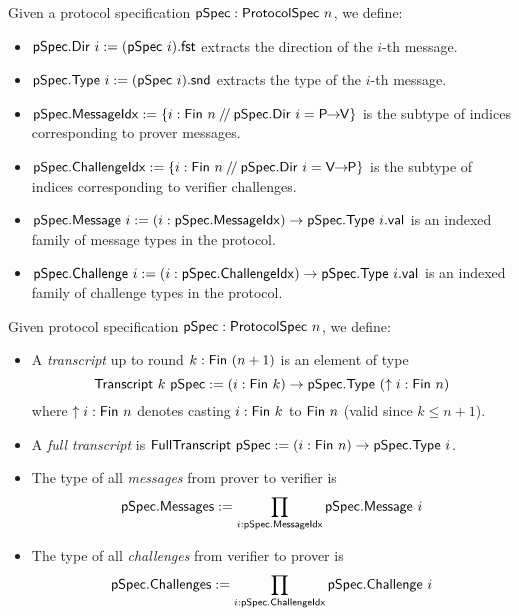 \begin{definition}
    \label{def:protocol_spec_components}
    Given a protocol specification $\pSpec : \ProtocolSpec\ n$, we define:
    \begin{itemize}
        \item $\pSpec.\Dir\ i := (\pSpec\ i).\mathsf{fst}$ extracts the direction of the $i$-th message.
        \item $\pSpec.\Type\ i := (\pSpec\ i).\mathsf{snd}$ extracts the type of the $i$-th message.
        \item $\mathsf{pSpec}.\mathsf{MessageIdx} := \{i : \mathsf{Fin}\ n \mathbin{/\!/} \mathsf{pSpec}.\mathsf{Dir}\ i = \mathsf{P \!\!\rightarrow\!\! V}\}$ is the subtype of indices corresponding to prover messages.
        \item $\mathsf{pSpec}.\mathsf{ChallengeIdx} := \{i : \mathsf{Fin}\ n \mathbin{/\!/} \mathsf{pSpec}.\mathsf{Dir}\ i = \mathsf{V \!\!\rightarrow\!\! P}\}$ is the subtype of indices corresponding to verifier challenges.
        \item $\mathsf{pSpec}.\mathsf{Message}\ i := (i : \mathsf{pSpec}.\mathsf{MessageIdx}) \to \mathsf{pSpec}.\mathsf{Type}\ i.\mathsf{val}$ is an indexed family of message types in the protocol.
        \item $\mathsf{pSpec}.\mathsf{Challenge}\ i := (i : \mathsf{pSpec}.\mathsf{ChallengeIdx}) \to \mathsf{pSpec}.\mathsf{Type}\ i.\mathsf{val}$ is an indexed family of challenge types in the protocol.
    \end{itemize}
\end{definition}

\begin{definition}
    \label{def:transcript}
        Given protocol specification $\pSpec : \ProtocolSpec\ n$, we define:
    \begin{itemize}
        \item A \emph{transcript} up to round $k : \mathsf{Fin}\ (n + 1)$ is an element of type
                \[ \mathsf{Transcript}\ k\ \mathsf{pSpec} := (i : \mathsf{Fin}\ k) \to \mathsf{pSpec}.\mathsf{Type}\ (\uparrow i : \mathsf{Fin}\ n) \]
        where $\uparrow i : \mathsf{Fin}\ n$ denotes casting $i : \mathsf{Fin}\ k$ to $\mathsf{Fin}\ n$ (valid since $k \leq n + 1$).

        \item A \emph{full transcript} is $\mathsf{FullTranscript}\ \mathsf{pSpec} := (i : \mathsf{Fin}\ n) \to \mathsf{pSpec}.\mathsf{Type}\ i$.

        \item The type of all \emph{messages} from prover to verifier is
        \[ \mathsf{pSpec}.\mathsf{Messages} := \prod_{i : \mathsf{pSpec}.\mathsf{MessageIdx}} \mathsf{pSpec}.\mathsf{Message}\ i \]

        \item The type of all \emph{challenges} from verifier to prover is
        \[ \mathsf{pSpec}.\mathsf{Challenges} := \prod_{i : \mathsf{pSpec}.\mathsf{ChallengeIdx}} \mathsf{pSpec}.\mathsf{Challenge}\ i \]
    \end{itemize}
\end{definition}

